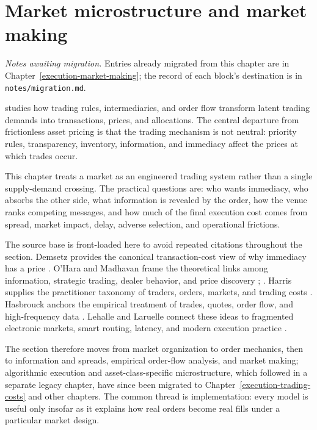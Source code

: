 \chapter{Market microstructure and market making}\label{legacy:execution-market-making}

\noindent\emph{Notes awaiting migration.} Entries already migrated from this chapter are in Chapter~\ref{execution-market-making}; the record of each block's destination is in \texttt{notes/migration.md}.

 studies how trading rules, intermediaries, and order flow transform latent trading demands into transactions, prices, and allocations. The central departure from frictionless asset pricing is that the trading mechanism is not neutral: priority rules, transparency, inventory, information, and immediacy affect the prices at which trades occur.

This chapter treats a market as an engineered trading system rather than a single supply-demand crossing. The practical questions are: who wants immediacy, who absorbs the other side, what information is revealed by the order, how the venue ranks competing messages, and how much of the final execution cost comes from spread, market impact, delay, adverse selection, and operational frictions.

The source base is front-loaded here to avoid repeated citations throughout the section. Demsetz provides the canonical transaction-cost view of why immediacy has a price \citep{demsetz-1968}. O'Hara and Madhavan frame the theoretical links among information, strategic trading, dealer behavior, and price discovery \citep{catalogue-0496}; \citep{madhavan-2000}. Harris supplies the practitioner taxonomy of traders, orders, markets, and trading costs \citep{alpha-harris}. Hasbrouck anchors the empirical treatment of trades, quotes, order flow, and high-frequency data \citep{s6-hasbrouck}. Lehalle and Laruelle connect these ideas to fragmented electronic markets, smart routing, latency, and modern execution practice \citep{alpha-laruelle}.

The section therefore moves from market organization to order mechanics, then to information and spreads, empirical order-flow analysis, and market making; algorithmic execution and asset-class-specific microstructure, which followed in a separate legacy chapter, have since been migrated to Chapter~\ref{execution-trading-costs} and other chapters. The common thread is implementation: every model is useful only insofar as it explains how real orders become real fills under a particular market design.



\newpage


\newpage


\newpage

